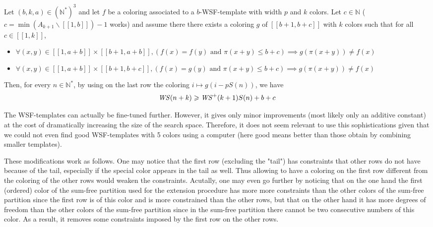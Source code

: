 \begin{proposition}
Let \((b, k, a) \in (\mathbb{N}^*)^3\) and let \(f\) be a coloring associated to a \(b\)-WSF-template with width \(p\) and \(k\) colors. Let
\(c \in \mathbb{N}\) (\(c = \min (A_{k+1} \backslash [\![1, b ]\!]) - 1\) works) and assume there there exists a coloring \(g\) of
\([\![b + 1, b + c]\!]\) with \(k\) colors such that for all \(c \in [\![1, k]\!]\),

\begin{itemize}
\item \(\forall (x, y) \in  [\![1, a + b]\!] \times  [\![b + 1, a + b]\!], (f(x) = f(y) \text{ and } \pi(x + y) \leqslant b + c)
	\implies g(\pi(x + y)) \neq f(x)\)
\item \(\forall (x, y) \in  [\![1, a + b]\!] \times  [\![b + 1, b + c]\!],  (f(x) = g(y) \text{ and } \pi(x + y) \leqslant b + c)
	\implies g(\pi(x + y)) \neq f(x)\)
\end{itemize}

Then, for every \(n \in \mathbb{N}^*\), by using on the last row the coloring \(i \longmapsto g(i - p S(n))\), we have\\
\[ \mathit{WS}(n+k) \geqslant \mathit{WS}^+(k+1) S(n) + b + c\]
\end{proposition}

The WSF-templates can actually be fine-tuned further. However, it gives only minor improvements (most likely only an additive
constant) at the cost of dramatically increasing the size of the search space. Therefore, it does not seem relevant to
use this sophistications given that we could not even find good WSF-templates with 5 colors using a computer (here good
means better than those obtain by combining smaller templates).

\par These modifications work as follows. One may notice that the first row (excluding the "tail") has constraints that other rows
do not have because of the tail, especially if the special color appears in the tail as well. Thus allowing to have a coloring on the
first row different from the coloring of the other rows would weaken the constraints. Acutally, one may even go further by
noticing that on the one hand the first (ordered) color of the sum-free partition used for the extension procedure has more
more constraints than the other colors of the sum-free partition since the first row is of this color and is more constrained than
the other rows, but that on the other hand it has more degrees of freedom than the other colors of the sum-free partition since in
the sum-free partition there cannot be two consecutive numbers of this color. As a result, it removes  some constraints imposed
 by the first row on the other rows.

